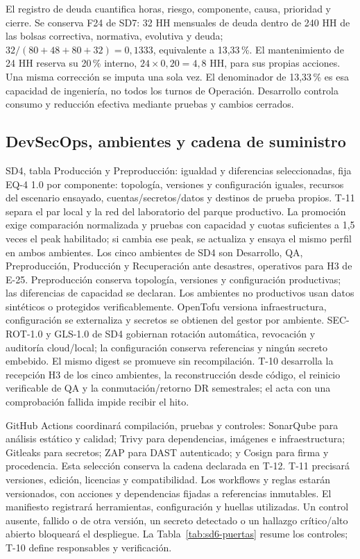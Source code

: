 El registro de deuda cuantifica horas, riesgo, componente, causa, prioridad y cierre. Se conserva F24 de SD7: 32 HH mensuales de deuda dentro de 240 HH de las bolsas correctiva, normativa, evolutiva y deuda; $32/(80+48+80+32)=0,1333$, equivalente a 13,33\,\%. El mantenimiento de 24 HH reserva su 20\,\% interno, $24\times0,20=4,8$ HH, para sus propias acciones. Una misma corrección se imputa una sola vez. El denominador de 13,33\,\% es esa capacidad de ingeniería, no todos los turnos de Operación. Desarrollo controla consumo y reducción efectiva mediante pruebas y cambios cerrados. \parencite[RT-21.21, p.~38]{sd6-bt}

\subsection{DevSecOps, ambientes y cadena de suministro}
SD4, tabla Producción y Preproducción: igualdad y diferencias seleccionadas, fija EQ-4 1.0 por componente: topología, versiones y configuración iguales, recursos del escenario ensayado, cuentas/secretos/datos y destinos de prueba propios. T-11 separa el par local y la red del laboratorio del parque productivo. La promoción exige comparación normalizada y pruebas con capacidad y cuotas suficientes a 1,5 veces el peak habilitado; si cambia ese peak, se actualiza y ensaya el mismo perfil en ambos ambientes. Los cinco ambientes de SD4 son Desarrollo, QA, Preproducción, Producción y Recuperación ante desastres, operativos para H3 de E-25. Preproducción conserva topología, versiones y configuración productivas; las diferencias de capacidad se declaran. Los ambientes no productivos usan datos sintéticos o protegidos verificablemente. OpenTofu versiona infraestructura, configuración se externaliza y secretos se obtienen del gestor por ambiente. SEC-ROT-1.0 y GLS-1.0 de SD4 gobiernan rotación automática, revocación y auditoría cloud/local; la configuración conserva referencias y ningún secreto embebido. El mismo digest se promueve sin recompilación. T-10 desarrolla la recepción H3 de los cinco ambientes, la reconstrucción desde código, el reinicio verificable de QA y la conmutación/retorno DR semestrales; el acta con una comprobación fallida impide recibir el hito. \parencite[RT-04.01/02/08/09, pp.~10--11; RT-11.25, p.~24]{sd6-bt}

GitHub Actions coordinará compilación, pruebas y controles: SonarQube para análisis estático y calidad; Trivy para dependencias, imágenes e infraestructura; Gitleaks para secretos; ZAP para DAST autenticado; y Cosign para firma y procedencia. Esta selección conserva la cadena declarada en T-12. T-11 precisará versiones, edición, licencias y compatibilidad. Los workflows y reglas estarán versionados, con acciones y dependencias fijadas a referencias inmutables. El manifiesto registrará herramientas, configuración y huellas utilizadas. Un control ausente, fallido o de otra versión, un secreto detectado o un hallazgo crítico/alto abierto bloqueará el despliegue. La Tabla~\ref{tab:sd6-puertas} resume los controles; T-10 define responsables y verificación. \parencites[RT-04.01--12, pp.~67--69]{sd6-t12}[PO.3/PO.4; PW.7/PW.8, tabla~1]{sd6-ssdf}


